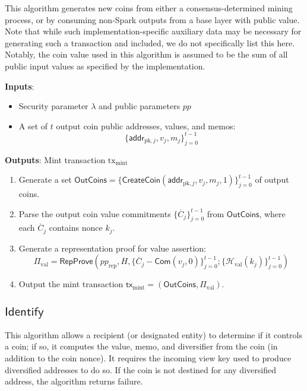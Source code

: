 \documentclass{llncs}
\newcommand{\hash}{\mathcal{H}}
\newcommand{\func}[1]{\mathsf{#1}}
\newcommand{\addr}{\func{addr}}
\newcommand{\com}{\func{Com}}
\begin{document}
This algorithm generates new coins from either a consensus-determined mining process, or by consuming non-Spark outputs from a base layer with public value.
Note that while such implementation-specific auxiliary data may be necessary for generating such a transaction and included, we do not specifically list this here.
Notably, the coin value used in this algorithm is assumed to be the sum of all public input values as specified by the implementation.

\textbf{Inputs}:
\begin{itemize}
    \item Security parameter $\lambda$ and public parameters $pp$
    \item A set of $t$ output coin public addresses, values, and memos: $$\{\addr_{\text{pk},j}, v_j, m_j\}_{j=0}^{t-1}$$
\end{itemize}

\textbf{Outputs}: Mint transaction $\text{tx}_{\text{mint}}$

\begin{enumerate}
    \item Generate a set $\func{OutCoins} = \{\func{CreateCoin}(\addr_{\text{pk},j}, v_j, m_j, 1)\}_{j=0}^{t-1}$ of output coins.
    \item Parse the output coin value commitments $\{\overline{C}_j\}_{j=0}^{t-1}$ from $\func{OutCoins}$, where each $\overline{C}_j$ contains nonce $k_j$.
    \item Generate a representation proof for value assertion: $$\Pi_{\text{val}} = \func{RepProve}\left( pp_{\text{rep}}, H, \{ \overline{C}_j - \com(v_j,0) \}_{j=0}^{t-1}; \{\hash_{\text{val}}(k_j)\}_{j=0}^{t-1} \right)$$
    \item Output the mint transaction $\func{tx}_{\text{mint}} = (\func{OutCoins}, \Pi_{\text{val}})$.
\end{enumerate}


\subsection{\texorpdfstring{$\func{Identify}$}{Identify}}

This algorithm allows a recipient (or designated entity) to determine if it controls a coin; if so, it computes the value, memo, and diversifier from the coin (in addition to the coin nonce).
It requires the incoming view key used to produce diversified addresses to do so.
If the coin is not destined for any diversified address, the algorithm returns failure.
\end{document}
